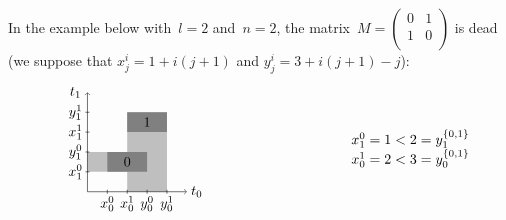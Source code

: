 \documentclass[orivec]{llncs} \usepackage[T1]{fontenc}
\newcommand\set[1]{\{#1\}}
\begin{document}
\begin{example}
  In the example below with~$l=2$ and~$n=2$, the matrix~$M=\left(
    \begin{matrix}
      0&1\\
      1&0\\
    \end{matrix}
  \right)$ is dead (we suppose that $x^i_j=1+i(j+1)$ and $y^i_j=3+i(j+1)-j$):
  \[
  \vcenter{
    \begin{tikzpicture}[scale=.5]
      \draw (5.5,0) node {$t_0$};
\draw (-.6,5) node {$t_1$};
      \fill[fill=lightgray] (0,1) -- (0,2) -- (3,2) -- (3,1) -- cycle;
      \fill[fill=lightgray] (2,0) -- (2,4) -- (4,4) -- (4,0) -- cycle;
      \fill[fill=gray] (1,1) -- (3,1) -- (3,2) -- (1,2) -- cycle;
      \fill[fill=gray] (2,3) -- (4,3) -- (4,4) -- (2,4) -- cycle;
      \draw (2,1.5) node {$0$};
      \draw (3,3.5) node {$1$};
      \foreach \x in {1,2,3,4} \draw (\x,-1mm) -- (\x,1mm);
      \foreach \x in {1,2,3,4} \draw (-1mm,\x) -- (1mm,\x);
      \draw (1,-.6) node {$x^0_0$};
      \draw (2,-.6) node {$x^1_0$};
      \draw (3,-.6) node {$y^0_0$};
      \draw (4,-.6) node {$y^1_0$};
      \draw (-.6,1) node {$x^0_1$};
      \draw (-.6,2) node {$y^0_1$};
      \draw (-.6,3) node {$x^1_1$};
      \draw (-.6,4) node {$y^1_1$};
      \draw[->] (0,0) -- (5,0);
      \draw[->] (0,0) -- (0,5);
    \end{tikzpicture}
  }
  \hspace{-30ex}
  \begin{array}{c}
    x^0_1=1<2=y^{\set{0,1}}_1\\
    x^1_0=2<3=y^{\set{0,1}}_0
  \end{array}
  \]
\end{example}
\end{document}
